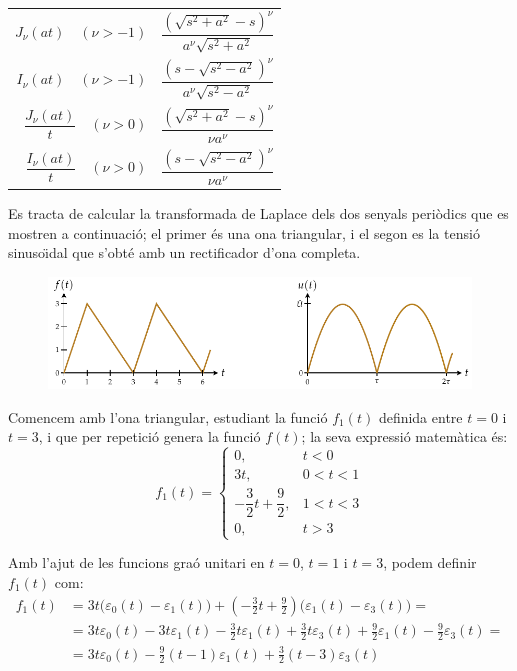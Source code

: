 \begin{longtable}{r<{\hspace{3em}}l}
   $J_\nu(a t)\quad(\nu>-1)$ & $\dfrac{\left(\sqrt{s^2+a^2}-s\right)^\nu}{a^\nu \sqrt{s^2+a^2}}$\\[2.4ex]
   $I_\nu(a t)\quad(\nu>-1)$ & $\dfrac{\left(s-\sqrt{s^2-a^2}\right)^\nu}{a^\nu \sqrt{s^2-a^2}}$\\[2.4ex]
   $\dfrac{J_\nu(a t)}{t}\quad(\nu>0)$ & $\dfrac{\left(\sqrt{s^2+a^2}-s\right)^\nu}{\nu a^\nu}$\\[2.4ex]
   $\dfrac{I_\nu(a t)}{t}\quad(\nu>0)$ & $\dfrac{\left(s-\sqrt{s^2-a^2}\right)^\nu}{\nu a^\nu}$\\[2.4ex]
    \bottomrule[1pt]
\end{longtable}

\begin{exemple}
    Es tracta de calcular la transformada de Laplace dels dos
    senyals peri\`{o}dics que es mostren a continuaci\'{o}; el primer \'{e}s una
    ona triangular, i el segon es la tensi\'{o} sinuso\"{\i}dal que s'obt\'{e} amb un
    rectificador d'ona completa.

\begin{figure}[h]
\centering
    \includegraphics{Imatges/Cap-Laplace-Exemple1.pdf}
\end{figure}

Comencem amb l'ona triangular, estudiant la funci\'{o} $f_1(t)$ definida
entre $t=0$ i $t=3$, i que per repetici\'{o} genera la funci\'{o} $f(t)$; la
seva expressi\'{o} matem\`{a}tica \'{e}s:
\[
    f_1(t) = \begin{cases} 0, & t < 0\\ 3t, & 0<t<1 \\ -\dfrac{3}{2}t
    +\dfrac{9}{2}, & 1 < t < 3 \\ 0, & t > 3 \end{cases}
\]

Amb l'ajut de les funcions gra\'{o} unitari en $t=0$, $t=1$ i $t=3$,
podem definir $f_1(t)$ com:
\[\begin{split}
    f_1(t) &= 3t \bigl(\varepsilon_0(t) - \varepsilon_1(t)\bigr) + \left(-\frac{3}{2}t
    +\frac{9}{2}\right) \bigl(\varepsilon_1(t) -
    \varepsilon_3(t)\bigr) = \\
    &=
    3t\varepsilon_0(t)-3t\varepsilon_1(t)-\frac{3}{2}t \varepsilon_1(t)
    +\frac{3}{2}t \varepsilon_3(t) +\frac{9}{2} \varepsilon_1(t)
    -\frac{9}{2} \varepsilon_3(t) = \\
    &=3t\varepsilon_0(t) -\frac{9}{2}(t-1)\varepsilon_1(t) +
    \frac{3}{2}(t-3)\varepsilon_3(t)
\end{split}\]


\end{exemple}
